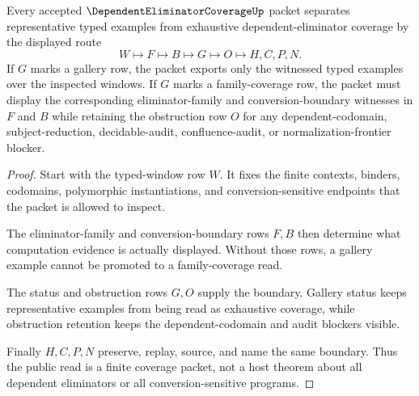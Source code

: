 \begin{theorem}\label{thm:dependent-eliminator-coverage-gallery-boundary}
Every accepted $\DependentEliminatorCoverageUp$ packet separates representative typed examples from exhaustive dependent-eliminator coverage by the displayed route
$$
W\longmapsto F\longmapsto B\longmapsto G\longmapsto O\longmapsto H,C,P,N .
$$
If $G$ marks a gallery row, the packet exports only the witnessed typed examples over the inspected windows. If $G$ marks a family-coverage row, the packet must display the corresponding eliminator-family and conversion-boundary witnesses in $F$ and $B$ while retaining the obstruction row $O$ for any dependent-codomain, subject-reduction, decidable-audit, confluence-audit, or normalization-frontier blocker.
\end{theorem}
\begin{proof}
Start with the typed-window row $W$. It fixes the finite contexts, binders, codomains, polymorphic instantiations, and conversion-sensitive endpoints that the packet is allowed to inspect.

The eliminator-family and conversion-boundary rows $F,B$ then determine what computation evidence is actually displayed. Without those rows, a gallery example cannot be promoted to a family-coverage read.

The status and obstruction rows $G,O$ supply the boundary. Gallery status keeps representative examples from being read as exhaustive coverage, while obstruction retention keeps the dependent-codomain and audit blockers visible.

Finally $H,C,P,N$ preserve, replay, source, and name the same boundary. Thus the public read is a finite coverage packet, not a host theorem about all dependent eliminators or all conversion-sensitive programs.
\end{proof}



